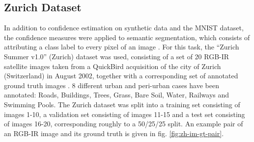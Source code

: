 \documentclass[10pt]{article}
\begin{document}

\subsection{Zurich Dataset}
\label{subsec:data-zurich}
In addition to confidence estimation on synthetic data and the MNIST dataset, the confidence measures were applied to semantic segmentation, which consists of attributing a class label to every pixel of an image \cite{Volpi2017DenseSL}. For this task, the ``Zurich Summer v1.0'' (Zurich) dataset was used, consisting of a set of 20 RGB-IR satellite images taken from a QuickBird acquisition of the city of Zurich (Switzerland) in August 2002, together with a corresponding set of annotated ground truth images \cite{Volpi2015SemanticSO}. 8 different urban and peri-urban cases have been annotated: Roads, Buildings, Trees, Grass, Bare Soil, Water, Railways and Swimming Pools. The Zurich dataset was split into a training set consisting of images 1-10, a validation set consisting of images 11-15 and a test set consisting of images 16-20, corresponding roughly to a 50/25/25 split. An example pair of an RGB-IR image and its ground truth is given in fig. \ref{fig:zh-im-gt-pair}.
\end{document}
